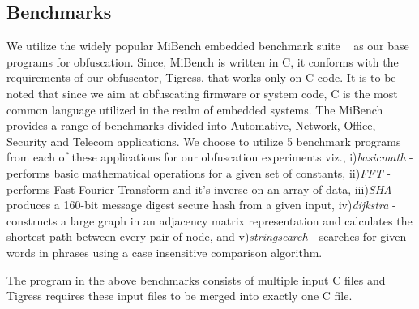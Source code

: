 \subsection{Benchmarks}

We utilize the widely popular MiBench embedded benchmark suite ~\cite{guthaus2001mibench} as our base programs for obfuscation. Since, MiBench is written in C, it conforms with the requirements of our obfuscator, Tigress, that works only on C code. It is to be noted that since we aim at obfuscating firmware or system code, C is the most common language utilized in the realm of embedded systems. The MiBench provides a range of benchmarks divided into Automative, Network, Office, Security and Telecom applications. We choose to utilize 5 benchmark programs from each of these applications for our obfuscation experiments viz., i)\textit{basicmath} - performs basic mathematical operations for a given set of constants, ii)\textit{FFT} - performs Fast Fourier Transform and it's inverse on an array of data, iii)\textit{SHA} - produces a 160-bit message digest secure hash from a given input, iv)\textit{dijkstra} - constructs a large graph in an adjacency matrix representation and calculates the shortest path between every pair of node, and v)\textit{stringsearch} - searches for given
words in phrases using a case insensitive comparison
algorithm.

The program in the above benchmarks consists of multiple input C files and Tigress requires these input files to be merged into exactly one C file. 
